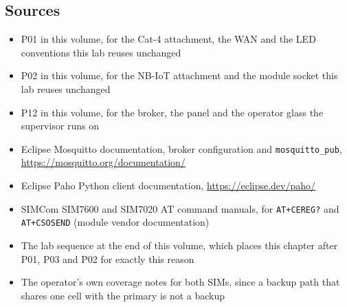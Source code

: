 \subsection*{Sources}

\begin{itemize}
\item P01 in this volume, for the Cat-4 attachment, the WAN and the LED conventions this lab reuses unchanged
\item P02 in this volume, for the NB-IoT attachment and the module socket this lab reuses unchanged
\item P12 in this volume, for the broker, the panel and the operator glass the supervisor runs on
\item Eclipse Mosquitto documentation, broker configuration and \texttt{mosquitto\_pub}, \url{https://mosquitto.org/documentation/}
\item Eclipse Paho Python client documentation, \url{https://eclipse.dev/paho/}
\item SIMCom SIM7600 and SIM7020 AT command manuals, for \texttt{AT+CEREG?} and \texttt{AT+CSOSEND} (module vendor documentation)
\item The lab sequence at the end of this volume, which places this chapter after P01, P03 and P02 for exactly this reason
\item The operator's own coverage notes for both SIMs, since a backup path that shares one cell with the primary is not a backup
\end{itemize}
